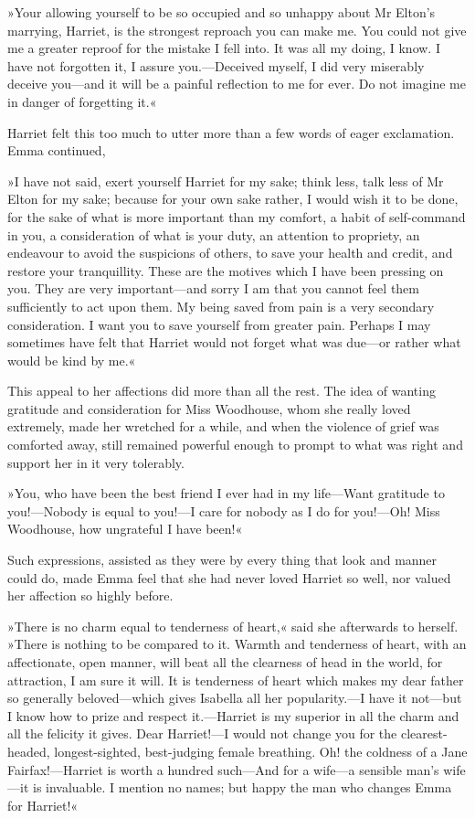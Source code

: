 »Your allowing yourself to be so occupied and so unhappy about Mr Elton's marrying, Harriet, is the strongest reproach you can make me. You could not give me a greater reproof for the mistake I fell into. It was all my doing, I know. I have not forgotten it, I assure you.—Deceived myself, I did very miserably deceive you—and it will be a painful reflection to me for ever. Do not imagine me in danger of forgetting it.«

Harriet felt this too much to utter more than a few words of eager exclamation. Emma continued,

»I have not said, exert yourself Harriet for my sake; think less, talk less of Mr Elton for my sake; because for your own sake rather, I would wish it to be done, for the sake of what is more important than my comfort, a habit of self-command in you, a consideration of what is your duty, an attention to propriety, an endeavour to avoid the suspicions of others, to save your health and credit, and restore your tranquillity. These are the motives which I have been pressing on you. They are very important—and sorry I am that you cannot feel them sufficiently to act upon them. My being saved from pain is a very secondary consideration. I want you to save yourself from greater pain. Perhaps I may sometimes have felt that Harriet would not forget what was due—or rather what would be kind by me.«

This appeal to her affections did more than all the rest. The idea of wanting gratitude and consideration for Miss Woodhouse, whom she really loved extremely, made her wretched for a while, and when the violence of grief was comforted away, still remained powerful enough to prompt to what was right and support her in it very tolerably.

»You, who have been the best friend I ever had in my life—Want gratitude to you!—Nobody is equal to you!—I care for nobody as I do for you!—Oh! Miss Woodhouse, how ungrateful I have been!«

Such expressions, assisted as they were by every thing that look and manner could do, made Emma feel that she had never loved Harriet so well, nor valued her affection so highly before.

»There is no charm equal to tenderness of heart,« said she afterwards to herself. »There is nothing to be compared to it. Warmth and tenderness of heart, with an affectionate, open manner, will beat all the clearness of head in the world, for attraction, I am sure it will. It is tenderness of heart which makes my dear father so generally beloved—which gives Isabella all her popularity.—I have it not—but I know how to prize and respect it.—Harriet is my superior in all the charm and all the felicity it gives. Dear Harriet!—I would not change you for the clearest-headed, longest-sighted, best-judging female breathing. Oh! the coldness of a Jane Fairfax!—Harriet is worth a hundred such—And for a wife—a sensible man's wife—it is invaluable. I mention no names; but happy the man who changes Emma for Harriet!«